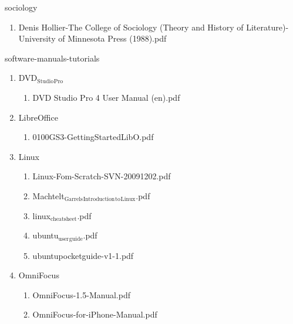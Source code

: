 \documentclass[11pt]{article}
\begin{document}
\item sociology
\label{sec-1-1-1-1-45}
\begin{enumerate}
\item Denis Hollier-The College of Sociology (Theory and History of Literature)-University of Minnesota Press (1988).pdf
\label{sec-1-1-1-1-45-1}
\end{enumerate}

\item software-manuals-tutorials
\label{sec-1-1-1-1-46}
\begin{enumerate}
\item DVD$_{\text{Studio}}$$_{\text{Pro}}$
\label{sec-1-1-1-1-46-1}
\begin{enumerate}
\item DVD Studio Pro 4 User Manual (en).pdf
\label{sec-1-1-1-1-46-1-1}
\end{enumerate}

\item LibreOffice
\label{sec-1-1-1-1-46-2}
\begin{enumerate}
\item 0100GS3-GettingStartedLibO.pdf
\label{sec-1-1-1-1-46-2-1}
\end{enumerate}

\item Linux
\label{sec-1-1-1-1-46-3}
\begin{enumerate}
\item Linux-Fom-Scratch-SVN-20091202.pdf
\label{sec-1-1-1-1-46-3-1}

\item Machtelt$_{\text{Garrels}}$$_{\text{Introduction}}$$_{\text{to}}$$_{\text{Linux}}$.pdf
\label{sec-1-1-1-1-46-3-2}

\item linux$_{\text{cheatsheet}}$.pdf
\label{sec-1-1-1-1-46-3-3}

\item ubuntu$_{\text{user}}$$_{\text{guide}}$.pdf
\label{sec-1-1-1-1-46-3-4}

\item ubuntupocketguide-v1-1.pdf
\label{sec-1-1-1-1-46-3-5}
\end{enumerate}

\item OmniFocus
\label{sec-1-1-1-1-46-4}
\begin{enumerate}
\item OmniFocus-1.5-Manual.pdf
\label{sec-1-1-1-1-46-4-1}

\item OmniFocus-for-iPhone-Manual.pdf
\label{sec-1-1-1-1-46-4-2}
\end{enumerate}


\end{enumerate}
\end{document}
